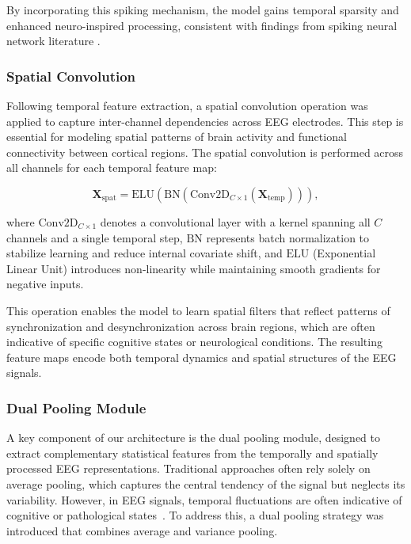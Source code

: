 \documentclass[pdflatex,sn-mathphys-num]{sn-jnl}%
\theoremstyle{thmstyleone}%
\theoremstyle{thmstyletwo}%
\theoremstyle{thmstylethree}%
\begin{document}
By incorporating this spiking mechanism, the model gains temporal sparsity and enhanced neuro-inspired processing, consistent with findings from spiking neural network literature \cite{maass2002real,neftci2019surrogate}.

\subsubsection{Spatial Convolution}

Following temporal feature extraction, a spatial convolution operation was applied to capture inter-channel dependencies across EEG electrodes. This step is essential for modeling spatial patterns of brain activity and functional connectivity between cortical regions. The spatial convolution is performed across all channels for each temporal feature map:

\begin{equation}
\mathbf{X}_{\text{spat}} = \text{ELU}(\text{BN}(\text{Conv2D}_{C \times 1}(\mathbf{X}_{\text{temp}}))),
\end{equation}

where \(\text{Conv2D}_{C \times 1}\) denotes a convolutional layer with a kernel spanning all \(C\) channels and a single temporal step, \(\text{BN}\) represents batch normalization to stabilize learning and reduce internal covariate shift, and \(\text{ELU}\) (Exponential Linear Unit) introduces non-linearity while maintaining smooth gradients for negative inputs.

This operation enables the model to learn spatial filters that reflect patterns of synchronization and desynchronization across brain regions, which are often indicative of specific cognitive states or neurological conditions. The resulting feature maps encode both temporal dynamics and spatial structures of the EEG signals.
\subsubsection{Dual Pooling Module}

A key component of our architecture is the dual pooling module, designed to extract complementary statistical features from the temporally and spatially processed EEG representations. Traditional approaches often rely solely on average pooling, which captures the central tendency of the signal but neglects its variability. However, in EEG signals, temporal fluctuations are often indicative of cognitive or pathological states~\cite{craik2019deep, roy2019chronnectome}. To address this, a dual pooling strategy was introduced that combines average and variance pooling.
\end{document}
